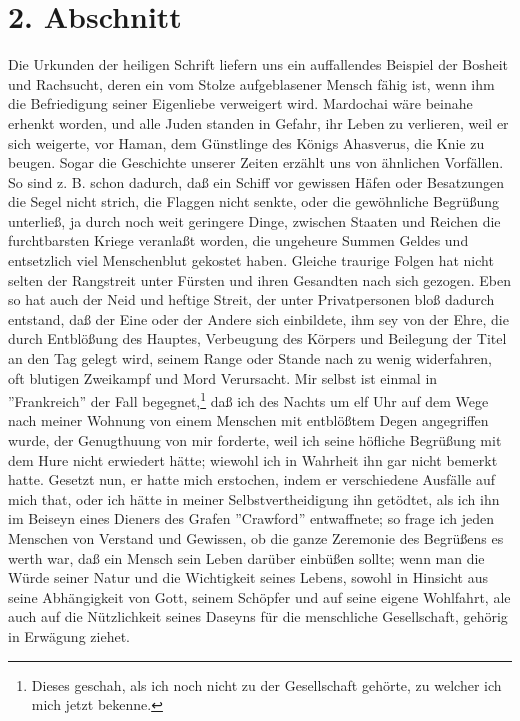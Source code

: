 \section{2. Abschnitt}

Die Urkunden der heiligen Schrift liefern uns ein auffallendes Beispiel der
Bosheit und Rachsucht, deren ein vom Stolze aufgeblasener Mensch fähig ist, wenn
ihm die Befriedigung seiner Eigenliebe verweigert wird. Mardochai wäre beinahe
erhenkt worden, und alle Juden standen in Gefahr, ihr Leben zu verlieren, weil
er sich weigerte, vor Haman, dem Günstlinge des Königs Ahasverus, die Knie zu
beugen. Sogar die Geschichte unserer Zeiten erzählt uns von ähnlichen Vorfällen.
So sind z. B. schon dadurch, daß ein Schiff vor gewissen Häfen oder Besatzungen
die Segel nicht strich, die Flaggen nicht senkte, oder die gewöhnliche Begrüßung
unterließ, ja durch noch weit geringere Dinge, zwischen Staaten und Reichen die
furchtbarsten Kriege veranlaßt worden, die ungeheure Summen Geldes und
entsetzlich viel Menschenblut gekostet haben. Gleiche traurige Folgen hat nicht
selten der Rangstreit unter Fürsten und ihren Gesandten nach sich gezogen. Eben
so hat auch der Neid und heftige Streit, der unter Privatpersonen bloß dadurch
entstand, daß der Eine oder der Andere sich einbildete, ihm sey von der Ehre,
die durch Entblößung des Hauptes, Verbeugung des Körpers und Beilegung der Titel
an den Tag gelegt wird, seinem Range oder Stande nach zu wenig widerfahren, oft
blutigen Zweikampf und Mord Verursacht. Mir selbst ist einmal in ''Frankreich''
der Fall begegnet,\footnote{Dieses geschah, als ich noch nicht zu der
Gesellschaft gehörte, zu welcher ich mich jetzt bekenne.} daß ich des Nachts um
elf Uhr auf dem Wege nach meiner Wohnung von einem Menschen mit entblößtem Degen
angegriffen wurde, der Genugthuung von mir forderte, weil ich seine höfliche
Begrüßung mit dem Hure nicht erwiedert hätte; wiewohl ich in Wahrheit ihn gar
nicht bemerkt hatte. Gesetzt nun, er hatte mich erstochen, indem er verschiedene
Ausfälle auf mich that, oder ich hätte in meiner Selbstvertheidigung ihn
getödtet, als ich ihn im Beiseyn eines Dieners des Grafen ''Crawford''
entwaffnete; so frage ich jeden Menschen von Verstand und Gewissen, ob die ganze
Zeremonie des Begrüßens es werth war, daß ein Mensch sein Leben darüber einbüßen
sollte; wenn man die Würde seiner Natur und die Wichtigkeit seines Lebens,
sowohl in Hinsicht aus seine Abhängigkeit von Gott, seinem Schöpfer und auf
seine eigene Wohlfahrt, ale auch auf die Nützlichkeit seines Daseyns für die
menschliche Gesellschaft, gehörig in Erwägung ziehet.

